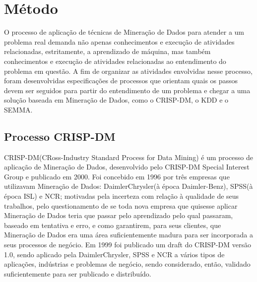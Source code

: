 \chapter{Método}



\cite{ML_know} \cite{balance-anarchy} \cite{ML_debt} \cite{replicability}

O processo de aplicação de técnicas de Mineração de Dados para atender a um problema real demanda não apenas conhecimentos e execução de atividades relacionadas, estritamente, a aprendizado de máquina, mas também conhecimentos e execução de atividades relacionadas ao entendimento do problema em questão. A fim de organizar as atividades envolvidas nesse processo, foram desenvolvidas especificações de processos que orientam quais os passos devem ser seguidos para partir do entendimento de um problema e chegar a uma solução baseada em Mineração de Dados, como o CRISP-DM, o KDD e o SEMMA\cite{CRISP-DM-KDD-SEMMA}.

\cite{CRISP-DM-KDD-SEMMA}

\section{Processo CRISP-DM}

CRISP-DM(CRoss-Industry Standard Process for Data Mining) é um processo de aplicação de Mineração de Dados, desenvolvido pelo CRISP-DM Special Interest Group e publicado em 2000. Foi concebido em 1996 por três empresas que utilizavam Mineração de Dados: DaimlerChrysler(à época Daimler-Benz), SPSS(à época ISL) e NCR; motivadas pela incerteza com relação à qualidade de seus trabalhos, pelo questionamento de se toda nova empresa que quisesse aplicar Mineração de Dados  teria que passar pelo aprendizado pelo qual passaram, baseado em tentativa e erro, e como garantirem, para seus clientes, que Mineração de Dados era uma área suficientemente madura para ser incorporada a seus processos de negócio. Em 1999 foi publicado um draft do CRISP-DM versão 1.0, sendo aplicado pela DaimlerChrysler, SPSS e NCR a vários tipos de aplicações, indústrias e problemas de negócio, sendo considerado, então, validado suficientemente para ser publicado e distribuído\cite{CRISP-DM}.

